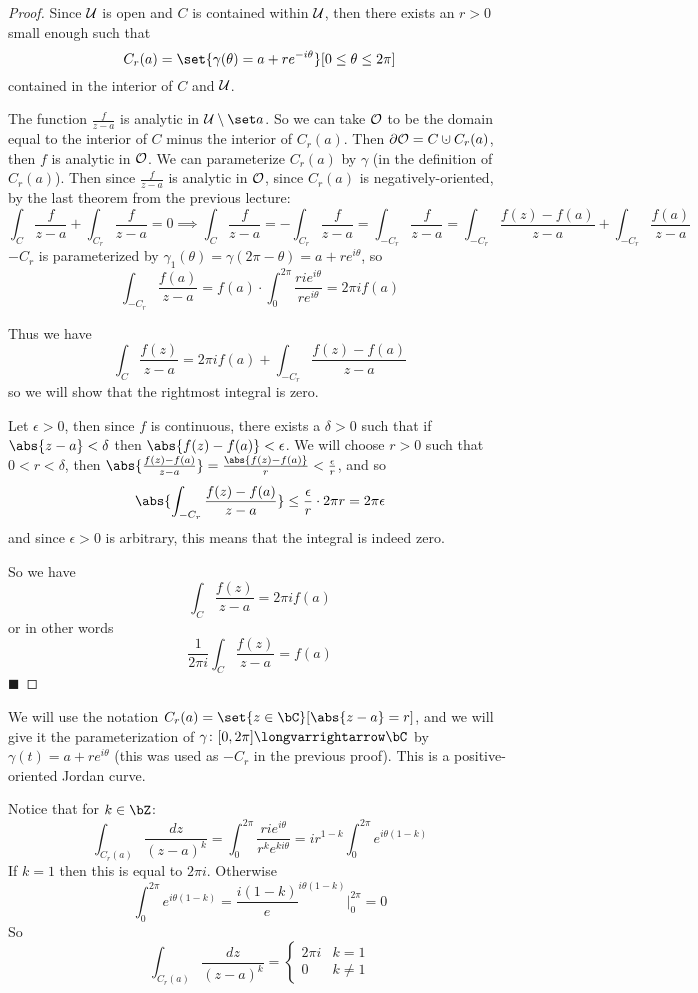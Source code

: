\documentclass[10pt]{article}
\def\mO{{\cal O}}
\def\mU{{\cal U}}
\let\longto=\longvarrightarrow
\def\qed{\hskip1cm\hbox{}\hfill$\blacksquare$}
\begin{document}
\begin{proof}

    Since $\mU$ is open and $C$ is contained within $\mU$, then there exists an $r>0$ small enough such that
    \[ C_r(a) = \set{\gamma(\theta)=a+re^{-i\theta}}[0\leq\theta\leq2\pi] \]
    contained in the interior of $C$ and $\mU$.

    The function $\frac f{z-a}$ is analytic in $\mU\setminus\set a$.
    So we can take $\mO$ to be the domain equal to the interior of $C$ minus the interior of $C_r(a)$.
    Then $\partial\mO=C\dcup C_r(a)$, then $f$ is analytic in $\mO$.
    We can parameterize $C_r(a)$ by $\gamma$ (in the definition of $C_r(a)$).
    Then since $\frac f{z-a}$ is analytic in $\mO$, since $C_r(a)$ is negatively-oriented, by the last theorem from the previous lecture:
    \[ \int_C\frac f{z-a} + \int_{C_r}\frac f{z-a} = 0 \implies \int_C\frac f{z-a} = -\int_{C_r}\frac f{z-a} = \int_{-C_r}\frac f{z-a} = \int_{-C_r}\frac{f(z)-f(a)}{z-a} + \int_{-C_r}\frac{f(a)}{z-a} \]
    $-C_r$ is parameterized by $\gamma_1(\theta)=\gamma(2\pi-\theta)=a+re^{i\theta}$, so
    \[ \int_{-C_r}\frac{f(a)}{z-a} = f(a)\cdot\int_0^{2\pi}\frac{rie^{i\theta}}{re^{i\theta}} = 2\pi if(a) \]

    Thus we have
    \[ \int_C\frac{f(z)}{z-a} = 2\pi if(a) + \int_{-C_r}\frac{f(z)-f(a)}{z-a} \]
    so we will show that the rightmost integral is zero.

    Let $\epsilon>0$, then since $f$ is continuous, there exists a $\delta>0$ such that if $\abs{z-a}<\delta$ then $\abs{f(z)-f(a)}<\epsilon$.
    We will choose $r>0$ such that $0<r<\delta$, then $\abs{\frac{f(z)-f(a)}{z-a}}=\frac{\abs{f(z)-f(a)}}{r}<\frac\epsilon r$, and so
    \[ \abs{\int_{-C_r}\frac{f(z)-f(a)}{z-a}} \leq \frac\epsilon r\cdot2\pi r = 2\pi\epsilon \]
    and since $\epsilon>0$ is arbitrary, this means that the integral is indeed zero.

    So we have
    \[ \int_C\frac{f(z)}{z-a} = 2\pi if(a) \]
    or in other words
    \[ \frac1{2\pi i}\int_C\frac{f(z)}{z-a} = f(a) \]
    \qed

\end{proof}

We will use the notation $C_r(a)=\set{z\in\bC}[\abs{z-a}=r]$, and we will give it the parameterization of $\gamma\colon[0,2\pi]\longto\bC$ by $\gamma(t)=a+re^{i\theta}$ (this was used as $-C_r$ in the
previous proof).
This is a positive-oriented Jordan curve.

Notice that for $k\in\bZ$:
\[ \int_{C_r(a)}\frac{dz}{(z-a)^k} = \int_0^{2\pi}\frac{rie^{i\theta}}{r^ke^{ki\theta}} = ir^{1-k}\int_0^{2\pi} e^{i\theta(1-k)} \]
If $k=1$ then this is equal to $2\pi i$.
Otherwise
\[ \int_0^{2\pi} e^{i\theta(1-k)} = \frac{i(1-k)}e^{i\theta(1-k)}\bigl|_0^{2\pi} = 0 \]
So
\[ \int_{C_r(a)}\frac{dz}{(z-a)^k} = \begin{cases} 2\pi i & k=1 \\ 0 & k\neq1 \end{cases} \]
\end{document}
